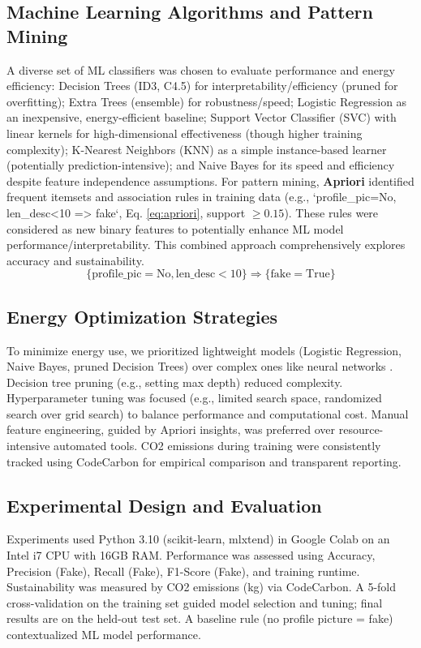 \documentclass[conference]{IEEEtran}
\begin{document}
\subsection{Machine Learning Algorithms and Pattern Mining}
A diverse set of ML classifiers was chosen to evaluate performance and energy efficiency: Decision Trees (ID3, C4.5) for interpretability/efficiency (pruned for overfitting); Extra Trees (ensemble) for robustness/speed; Logistic Regression as an inexpensive, energy-efficient baseline; Support Vector Classifier (SVC) with linear kernels for high-dimensional effectiveness (though higher training complexity); K-Nearest Neighbors (KNN) as a simple instance-based learner (potentially prediction-intensive); and Naive Bayes for its speed and efficiency despite feature independence assumptions.
For pattern mining, \textbf{Apriori} identified frequent itemsets and association rules in training data (e.g., `profile_pic=No, len_desc<10 => fake`, Eq. \ref{eq:apriori}, support $\ge 0.15$). These rules were considered as new binary features to potentially enhance ML model performance/interpretability. This combined approach comprehensively explores accuracy and sustainability.
\begin{equation}
\{\text{profile\_pic}=\text{No}, \text{len\_desc}<10\} \Rightarrow \{\text{fake}=\text{True}\}
\label{eq:apriori}
\end{equation}

\subsection{Energy Optimization Strategies}
To minimize energy use, we prioritized lightweight models (Logistic Regression, Naive Bayes, pruned Decision Trees) over complex ones like neural networks \cite{b6, b4}. Decision tree pruning (e.g., setting max depth) reduced complexity. Hyperparameter tuning was focused (e.g., limited search space, randomized search over grid search) to balance performance and computational cost. Manual feature engineering, guided by Apriori insights, was preferred over resource-intensive automated tools. CO2 emissions during training were consistently tracked using CodeCarbon \cite{b13} for empirical comparison and transparent reporting.

\subsection{Experimental Design and Evaluation}
Experiments used Python 3.10 (scikit-learn, mlxtend) in Google Colab on an Intel i7 CPU with 16GB RAM. Performance was assessed using Accuracy, Precision (Fake), Recall (Fake), F1-Score (Fake), and training runtime. Sustainability was measured by CO2 emissions (kg) via CodeCarbon. A 5-fold cross-validation on the training set guided model selection and tuning; final results are on the held-out test set. A baseline rule (no profile picture = fake) contextualized ML model performance.
\end{document}
